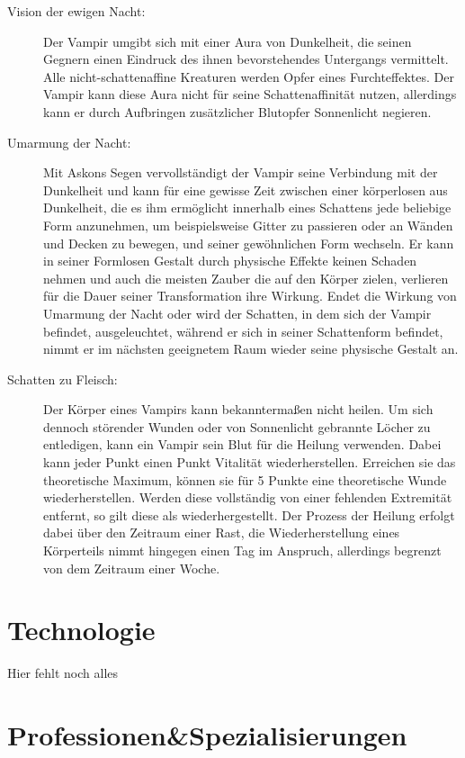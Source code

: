 \documentclass[a4paper,12pt,oneside]{book}
\begin{document}
\begin{description}
\begin{description}
\item[Vision der ewigen Nacht:]
Der Vampir umgibt sich mit einer Aura von Dunkelheit, die seinen Gegnern einen Eindruck des ihnen bevorstehendes Untergangs vermittelt. Alle nicht-schattenaffine Kreaturen werden Opfer eines Furchteffektes. Der Vampir kann diese Aura nicht für seine Schattenaffinität nutzen, allerdings kann er durch Aufbringen zusätzlicher Blutopfer Sonnenlicht negieren.
\item[Umarmung der Nacht:]
Mit Askons Segen vervollständigt der Vampir seine Verbindung mit der Dunkelheit und kann für eine gewisse Zeit zwischen einer körperlosen aus Dunkelheit, die es ihm ermöglicht innerhalb eines Schattens jede beliebige Form anzunehmen, um beispielsweise Gitter zu passieren oder an Wänden und Decken zu bewegen, und seiner gewöhnlichen Form wechseln. Er kann in seiner Formlosen Gestalt durch physische Effekte keinen Schaden nehmen und auch die meisten Zauber die auf den Körper zielen, verlieren für die Dauer seiner Transformation ihre Wirkung. Endet die Wirkung von Umarmung der Nacht oder wird der Schatten, in dem sich der Vampir befindet, ausgeleuchtet, während er sich in seiner Schattenform befindet, nimmt er im nächsten geeignetem Raum wieder seine physische Gestalt an.
\item[Schatten zu Fleisch:]
Der Körper eines Vampirs kann bekanntermaßen nicht heilen. Um sich dennoch störender Wunden oder von Sonnenlicht gebrannte Löcher zu entledigen, kann ein Vampir sein Blut für die Heilung verwenden. Dabei kann jeder Punkt einen Punkt Vitalität wiederherstellen. Erreichen sie das theoretische Maximum, können sie für 5 Punkte eine theoretische Wunde wiederherstellen. Werden diese vollständig von einer fehlenden Extremität entfernt, so gilt diese als wiederhergestellt. Der Prozess der Heilung erfolgt dabei über den Zeitraum einer Rast, die Wiederherstellung eines Körperteils nimmt hingegen einen Tag im Anspruch, allerdings begrenzt von dem Zeitraum einer Woche.
\end{description}


\end{description}

{}
\printindex[Kreaturen]
\part{Technologie}
\setcounter{chapter}{0}
Hier fehlt noch alles\newpage
\part{Professionen\&Spezialisierungen}
\setcounter{chapter}{0}
\end{document}
